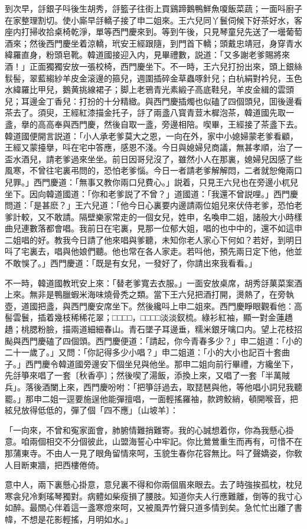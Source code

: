 到次早，㧱銀子呌後生胡秀，㧱籃子往街上買鷄蹄鵝鴨鮮魚嗄飯菜蔬；一面呌廚子在家整理割切。使小廝早㧱轎子接了申二姐來。王六兒同丫鬟伺候下好茶好水，客座内打掃收拾桌椅乾淨，單等西門慶來到。等到午後，只見琴童兒先送了一壜葡萄酒來；然後西門慶坐着涼轎，玳安王經跟隨，到門首下轎；頭戴忠靖冠，身穿青水緯羅直身，粉頭皂靴。韓道國接迎入内，見畢禮數，説道：「又多謝老爹賜將來酒！」正面獨獨安放一張校椅，西門慶坐下。不一時，王六兒打扮出來，頭上銀絲䯼髻，翠藍縐紗羊皮金滚邊的箍兒，週圍插碎金草蟲啄針兒；白杭絹對衿兒，玉色水緯羅比甲兒，鵝黄挑線裙子；脚上老鴉青光素緞子高底鞋兒，羊皮金緝的雲頭兒；耳邊金丁香兒：打扮的十分精緻。與西門慶插燭也似磕了四個頭兒，囬後邊看茶去了。須臾，王經紅漆描金托子，㧱了兩盞八寳青荳木樨泡茶，韓道國先取一盞，擧的高高奉與西門慶，然後自取一盞，旁邊相陪。喫畢，王經接了茶盞下去。韓道國便開言説道：「小人承老爹莫大之恩，一向在外，家中小媳婦蒙老爹看顧，王經又蒙擡擧，呌在宅中答應，感恩不淺。今日與媳婦兒商議，無甚孝順，治了一盃水酒兒，請老爹過來坐坐。前日因哥兒沒了，雖然小人在那裏，媳婦兒因感了些風寒，不曾往宅裏弔問的，恐怕老爹惱。今日一者請老爹解解悶，二者就恕俺兩口兒罪。」西門慶道：「無事又教你兩口兒費心。」説着，只見王六兒也在旁邊小杌兒坐下。因向韓道國道：「你和老爹説了不曾？」道國道：「我還不曾説哩。」西門慶問道：「是甚麽？」王六兒道：「他今日心裏要内邊請兩位姐兒來伏侍老爹，恐怕老爹計較，又不敢請。隔壁樂家常走的一個女兒，姓申，名喚申二姐，諸般大小時樣曲兒連數落都會唱。我前日在宅裏，見那一位郁大姐，唱的也中中的，還不如這申二姐唱的好。教我今日請了他來唱與爹聽，未知你老人家心下何如？若好，到明日呌了宅裏去，唱與他娘們聽。他也常在各人家走。若呌他，預先兩日定下他，他並不敢悞了。」西門慶道：「既是有女兒，一發好了，你請出來我看看。」

不一時，韓道國教玳安上來：「替老爹寬去衣服。」一面安放桌席，胡秀㧱菓菜案酒上來。無非是鴨臘蝦米海味燒骨秃之類。當下王六兒把酒打開，燙熱了，在旁執壺，道國把盞，與西門慶安席坐下。然後纔呌上申二姐來。西門慶睜眼觀看他：高髻雲鬟，插着幾枝稀稀花翠；□□□□，□□□□淡淡釵梳。綠衫紅袖，顯一對金蓮趫趫；桃腮粉臉，描兩道細細春山。青石墜子耳邊垂，糯米銀牙噙口内。望上花枝招颭與西門慶磕了四個頭。西門慶便道：「請起，你今青春多少？」申二姐道：「小的二十一歲了。」又問：「你記得多少小唱？」申二姐道：「小的大小也記百十套曲子。」西門慶令韓道國旁邊安下個坐兒與他坐。那申二姐向前行畢禮，方纔坐下，先㧱箏來唱了一套〔秋香亭〕；然後喫了湯飯，添換上來，又唱了一套「半萬賊兵」。落後酒闌上來，西門慶吩咐：「把箏㧱過去，取琵琶與他，等他唱小詞兒我聽罷。」那申二姐一逕要施逞他能彈擅唱，一面輕搖羅袖，款跨鮫綃，頓開喉音，把絃兒放得低低的，彈了個「四不應」〔山坡羊〕：

\begin{myquote}
「一向來，不曾和寃家面會，肺腑情難捎難寄。我的心誠想着你，你為我懸心掛意。咱兩個相交不分個彼此，山盟海誓心中牢記。你比鶯鶯重生而再有，可惜不在那蒲東寺。不由人一見了眼角留情來呵，玉貌生春你花容無比。呌了聲嬌姿，你敎人目断東牆，把西樓倦倚。

意中人，兩下裏懸心掛意，意兒裏不得和你兩個眉來眼去。去了時強挨孤枕，枕兒寒衾兒冷剩瑤琴獨對。病體如柴瘦損了腰肢。知道你夫人行應難離，倒等的我寸心如醉。最關心伴着這一盞寒燈來呵，又被風弄竹聲只道多情到矣。急忙忙出離了書幃，不想是花影輕搖，月明如水。」
\end{myquote}

